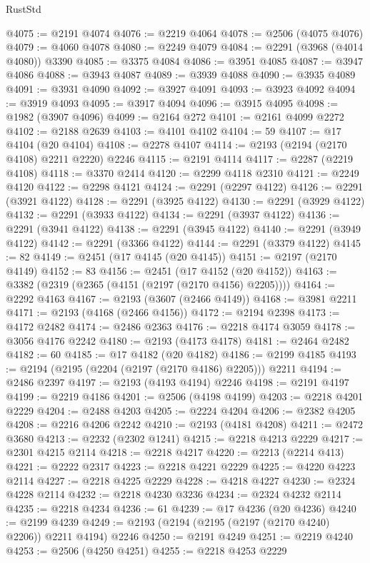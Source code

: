 \begin{lexlean}{RustStd}
\begin{coremodule}
@4075 := @2191 @4074
@4076 := @2219 @4064
@4078 := @2506 (@4075 @4076)
@4079 := @4060 @4078
@4080 := @2249 @4079
@4084 := @2291 (@3968 (@4014 @4080)) @3390
@4085 := @3375 @4084
@4086 := @3951 @4085
@4087 := @3947 @4086
@4088 := @3943 @4087
@4089 := @3939 @4088
@4090 := @3935 @4089
@4091 := @3931 @4090
@4092 := @3927 @4091
@4093 := @3923 @4092
@4094 := @3919 @4093
@4095 := @3917 @4094
@4096 := @3915 @4095
@4098 := @1982 (@3907 @4096)
@4099 := @2164 @272
@4101 := @2161 @4099 @2272
@4102 := @2188 @2639
@4103 := @4101 @4102
@4104 := 59
@4107 := @17 @4104 (@20 @4104)
@4108 := @2278 @4107
@4114 := @2193 (@2194 (@2170 @4108) @2211 @2220) @2246
@4115 := @2191 @4114
@4117 := @2287 (@2219 @4108)
@4118 := @3370 @2414
@4120 := @2299 @4118 @2310
@4121 := @2249 @4120
@4122 := @2298 @4121
@4124 := @2291 (@2297 @4122)
@4126 := @2291 (@3921 @4122)
@4128 := @2291 (@3925 @4122)
@4130 := @2291 (@3929 @4122)
@4132 := @2291 (@3933 @4122)
@4134 := @2291 (@3937 @4122)
@4136 := @2291 (@3941 @4122)
@4138 := @2291 (@3945 @4122)
@4140 := @2291 (@3949 @4122)
@4142 := @2291 (@3366 @4122)
@4144 := @2291 (@3379 @4122)
@4145 := 82
@4149 := @2451 (@17 @4145 (@20 @4145))
@4151 := @2197 (@2170 @4149)
@4152 := 83
@4156 := @2451 (@17 @4152 (@20 @4152))
@4163 := @3382 (@2319 (@2365 (@4151 (@2197 (@2170 @4156) @2205))))
@4164 := @2292 @4163
@4167 := @2193 (@3607 (@2466 @4149))
@4168 := @3981 @2211
@4171 := @2193 (@4168 (@2466 @4156))
@4172 := @2194 @2398
@4173 := @4172 @2482
@4174 := @2486 @2363
@4176 := @2218 @4174 @3059
@4178 := @3056 @4176 @2242
@4180 := @2193 (@4173 @4178)
@4181 := @2464 @2482
@4182 := 60
@4185 := @17 @4182 (@20 @4182)
@4186 := @2199 @4185
@4193 := @2194 (@2195 (@2204 (@2197 (@2170 @4186) @2205))) @2211
@4194 := @2486 @2397
@4197 := @2193 (@4193 @4194) @2246
@4198 := @2191 @4197
@4199 := @2219 @4186
@4201 := @2506 (@4198 @4199)
@4203 := @2218 @4201 @2229
@4204 := @2488 @4203
@4205 := @2224 @4204
@4206 := @2382 @4205
@4208 := @2216 @4206 @2242
@4210 := @2193 (@4181 @4208)
@4211 := @2472 @3680
@4213 := @2232 (@2302 @1241)
@4215 := @2218 @4213 @2229
@4217 := @2301 @4215 @2114
@4218 := @2218 @4217
@4220 := @2213 (@2214 @413)
@4221 := @2222 @2317
@4223 := @2218 @4221 @2229
@4225 := @4220 @4223 @2114
@4227 := @2218 @4225 @2229
@4228 := @4218 @4227
@4230 := @2324 @4228 @2114
@4232 := @2218 @4230 @3236
@4234 := @2324 @4232 @2114
@4235 := @2218 @4234
@4236 := 61
@4239 := @17 @4236 (@20 @4236)
@4240 := @2199 @4239
@4249 := @2193 (@2194 (@2195 (@2197 (@2170 @4240) @2206)) @2211 @4194) @2246
@4250 := @2191 @4249
@4251 := @2219 @4240
@4253 := @2506 (@4250 @4251)
@4255 := @2218 @4253 @2229

\end{coremodule}
\end{lexlean}
